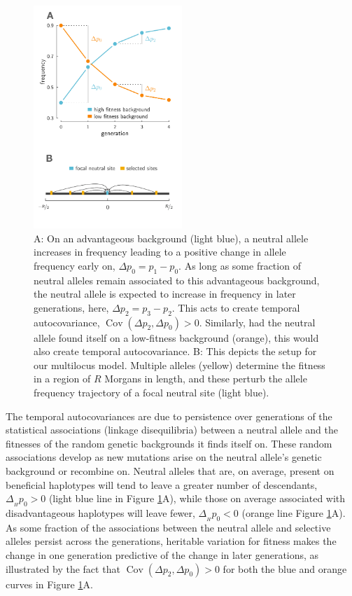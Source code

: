 \documentclass[11pt]{article}
\DeclareMathOperator{\cov}{Cov}
\begin{document}
\begin{figure}[!ht]
  \centering
  \includegraphics[width=0.5\textwidth]{./images/keynote-cartoons-figure-1.pdf}

  \caption{A: On an advantageous background (light blue), a neutral allele
    increases in frequency leading to a positive change in allele frequency
    early on, $\Delta p_0 = p_1 - p_0$. As long as some fraction of neutral
    alleles remain associated to this advantageous background, the neutral
    allele is expected to increase in frequency in later generations, here,
    $\Delta p_2 = p_3 - p_2$. This acts to create temporal autocovariance,
    $\cov(\Delta p_2, \Delta p_0) > 0$. Similarly, had the neutral allele found
    itself on a low-fitness background (orange), this would also create temporal
    autocovariance.  B: This depicts the setup for our multilocus model.
    Multiple alleles (yellow) determine the fitness in a region of $R$ 
    Morgans in length, and these perturb the allele frequency trajectory 
    of a focal neutral site (light blue). 
  }
  \label{fig:cartoon}
\end{figure}

The temporal autocovariances are due to persistence over generations of the
statistical associations (linkage disequilibria) between a neutral allele and
the fitnesses of the random genetic backgrounds it finds itself on.  These
random associations develop as new mutations arise on the neutral allele's
genetic background or recombine on. Neutral alleles that are, on average,
present on beneficial haplotypes will tend to leave a greater number of
descendants, $\Delta_{_H} p_0 > 0$ (light blue line in Figure
\ref{fig:cartoon}A), while those on average associated with disadvantageous
haplotypes will leave fewer, $\Delta_{_H} p_0 < 0$ (orange line Figure
\ref{fig:cartoon}A). As some fraction of the associations between the neutral
allele and selective alleles persist across the generations, heritable
variation for fitness makes the change in one generation predictive of the
change in later generations, as illustrated by the fact that $\cov(\Delta p_2,
\Delta p_0) > 0$ for both the blue and orange curves in Figure
\ref{fig:cartoon}A.
\end{document}
